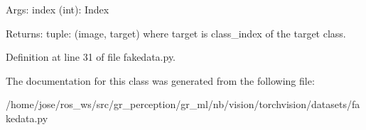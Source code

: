 \begin{DoxyVerb}Args:
    index (int): Index

Returns:
    tuple: (image, target) where target is class_index of the target class.
\end{DoxyVerb}
 

Definition at line 31 of file fakedata.\+py.



The documentation for this class was generated from the following file\+:\begin{DoxyCompactItemize}
\item 
/home/jose/ros\+\_\+ws/src/gr\+\_\+perception/gr\+\_\+ml/nb/vision/torchvision/datasets/fakedata.\+py\end{DoxyCompactItemize}
